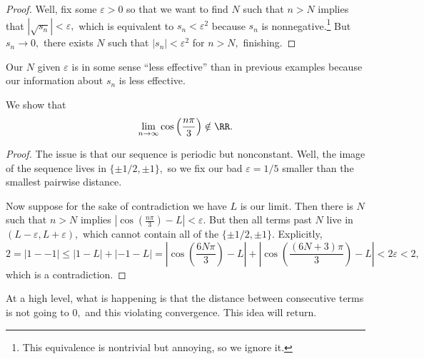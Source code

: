 \documentclass[../notes.tex]{subfiles}
\begin{document}
\begin{proof}
	Well, fix some $\varepsilon>0$ so that we want to find $N$ such that $n>N$ implies that $|\sqrt{s_n}|<\varepsilon,$ which is equivalent to $s_n<\varepsilon^2$ because $s_n$ is nonnegative.\footnote{This equivalence is nontrivial but annoying, so we ignore it.} But $s_n\to0,$ there exists $N$ such that $|s_n|<\varepsilon^2$ for $n>N,$ finishing.
\end{proof}
\begin{remark}
	Our $N$ given $\varepsilon$ is in some sense ``less effective'' than in previous examples because our information about $s_n$ is less effective.
\end{remark}
\begin{exercise}
	We show that
	\[\lim_{n\to\infty}\cos\left(\frac{n\pi}3\right)\notin\RR.\]
\end{exercise}
\begin{proof}
	The issue is that our sequence is periodic but nonconstant. Well, the image of the sequence lives in $\{\pm1/2,\pm1\},$ so we fix our bad $\varepsilon=1/5$ smaller than the smallest pairwise distance.

	Now suppose for the sake of contradiction we have $L$ is our limit. Then there is $N$ such that $n>N$ implies $\left|\cos\left(\frac{n\pi}3\right)-L\right|<\varepsilon.$ But then all terms past $N$ live in $(L-\varepsilon,L+\varepsilon),$ which cannot contain all of the $\{\pm1/2,\pm1\}.$ Explicitly,
	\[2=|1--1|\le|1-L|+|-1-L|=\left|\cos\left(\frac{6N\pi}3\right)-L\right|+\left|\cos\left(\frac{(6N+3)\pi}3\right)-L\right|<2\varepsilon<2,\]
	which is a contradiction.
\end{proof}
\begin{remark}
	At a high level, what is happening is that the distance between consecutive terms is not going to $0,$ and this violating convergence. This idea will return. 
\end{remark}
\end{document}
